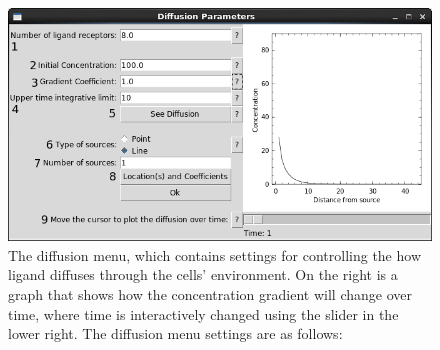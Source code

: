 \documentclass[12pt]{article}
\begin{document}
\begin{figure}[H]
\centering
\includegraphics[width=13.51cm]{media/diffusion_screen_annotated.png}
\caption[]{The diffusion menu, which contains 
settings for controlling the how ligand diffuses through the cells'
environment. On the right is a graph that shows how the 
concentration gradient will change over time, where time is 
interactively changed using the slider in the lower right. The diffusion 
menu settings are as follows:
}
\end{figure}
\end{document}
